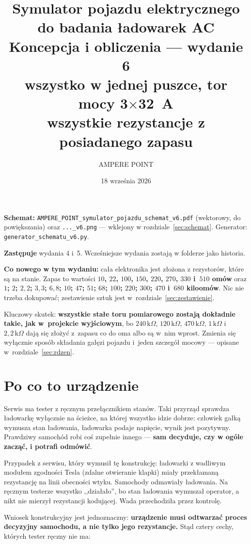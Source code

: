 \documentclass[a4paper,11pt]{article}
\title{\vspace{-1.5cm}Symulator pojazdu elektrycznego do badania ładowarek AC\\[2mm]
\large Koncepcja i obliczenia --- wydanie 6\\[1mm]
\normalsize wszystko w jednej puszce, tor mocy 3$\times$32~A\\[1mm]
\normalsize wszystkie rezystancje z posiadanego zapasu}
\author{AMPERE POINT}
\date{18 września 2026}
\newcommand{\kohm}{\,\mathrm{k}\Omega}
\begin{document}
\maketitle
\thispagestyle{empty}

\noindent\textbf{Schemat:} \texttt{AMPERE\_POINT\_symulator\_pojazdu\_schemat\_v6.pdf}
(wektorowy, do powiększania) oraz \texttt{...\_v6.png} --- wklejony w rozdziale~\ref{sec:schemat}.
Generator: \texttt{generator\_schematu\_v6.py}.

\noindent\textbf{Zastępuje} wydania 4 i~5. Wcześniejsze wydania zostają w folderze jako historia.

\noindent\textbf{Co nowego w tym wydaniu:} cała elektronika jest złożona z rezystorów, które
są na stanie. Zapas to wartości \textbf{$10$, $22$, $100$, $150$, $220$, $270$, $330$
i~$510$ omów} oraz \textbf{$1$; $2$; $2{,}2$; $3{,}3$; $6{,}8$; $10$; $47$; $51$; $68$;
$100$; $220$; $300$; $470$ i~$680$ kiloomów}. Nic nie trzeba dokupować; zestawienie sztuk
jest w~rozdziale~\ref{sec:zestawienie}.

\noindent Kluczowy skutek: \textbf{wszystkie stałe toru pomiarowego zostają dokładnie takie,
jak w~projekcie wyjściowym}, bo $240\kohm$, $120\kohm$, $470\kohm$, $1\kohm$ i~$2{,}2\kohm$
dają się złożyć z~zapasu co do oma albo są w~nim wprost. Zmienia się wyłącznie sposób
składania gałęzi pojazdu i~jeden szczegół mocowy --- opisane w~rozdziale~\ref{sec:rdzen}.

\tableofcontents

\section{Po co to urządzenie}

Serwis ma tester z ręcznym przełącznikiem stanów. Taki przyrząd sprawdza ładowarkę
wyłącznie na ścieżce, na której wszystko idzie dobrze: człowiek gałką wymusza stan
ładowania, ładowarka podaje napięcie, wynik jest pozytywny. Prawdziwy samochód robi
coś zupełnie innego --- \textbf{sam decyduje, czy w ogóle zacząć, i potrafi odmówić}.

Przypadek z serwisu, który wymusił tę konstrukcję: ładowarki z wadliwym modułem
zgodności Tesla (zdalne otwieranie klapki) miały przekłamaną rezystancję na linii
obecności wtyku. Samochody odmawiały ładowania. Na ręcznym testerze wszystko
,,działało'', bo stan ładowania wymuszał operator, a nikt nie mierzył rezystancji
kodującej. Wada przechodziła przez kontrolę.

Wniosek konstrukcyjny jest jednoznaczny: \textbf{urządzenie musi odtwarzać proces
decyzyjny samochodu, a nie tylko jego rezystancje.} Stąd cztery cechy, których
tester ręczny nie ma:
\end{document}
